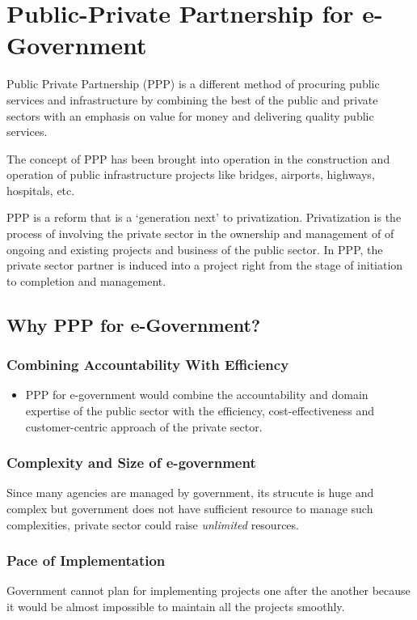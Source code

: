 \chapter{Public-Private Partnership for e-Government}
Public Private Partnership (PPP) is a different method of procuring public services and infrastructure by  combining the best of the public and private sectors with an emphasis on value for money and delivering quality public services.

The concept of PPP has been brought into operation in the construction and operation of public infrastructure projects like bridges, airports, highways, hospitals, etc.

PPP is a reform that is a `generation next' to privatization. Privatization is the process of involving the private sector in the ownership and management of of ongoing and existing projects and business of the public sector. In PPP, the private sector partner is induced into a project right from the stage of initiation to completion and management.

\section*{Why PPP for e-Government?}

\subsection*{Combining Accountability With Efficiency}
\begin{itemize}
	\item PPP for e-government would combine the accountability and domain expertise of the public sector with the efficiency, cost-effectiveness and customer-centric approach of the private sector.
\end{itemize}

\subsection*{Complexity and Size of e-government}
Since many agencies are managed by government, its strucute is huge and complex but government does not have sufficient resource to manage such complexities, private sector could raise \textit{unlimited} resources.

\subsection*{Pace of Implementation}
Government cannot plan for implementing projects one after the another because it would be almost impossible to maintain all the projects smoothly. 

